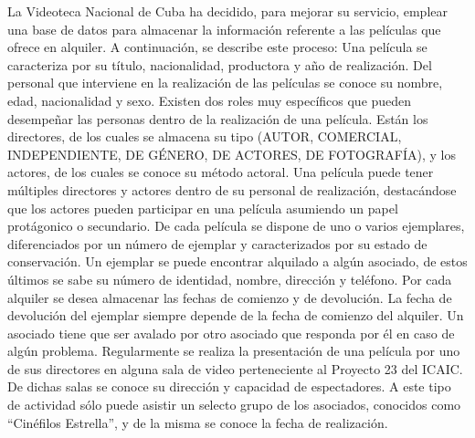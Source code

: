 La Videoteca Nacional de Cuba ha decidido, para mejorar su servicio, emplear una base de datos para almacenar la informaci\'on referente a las pel\'iculas que ofrece en alquiler. A continuaci\'on, se describe este proceso: Una pel\'icula se caracteriza por su t\'itulo, nacionalidad, productora y a\~no de realizaci\'on. Del personal que interviene en la realizaci\'on de las pel\'iculas se conoce su nombre, edad, nacionalidad y sexo. Existen dos roles muy espec\'ificos que pueden desempe\~nar las personas dentro de la realizaci\'on de una pel\'icula. Est\'an los directores, de los cuales se almacena su tipo (AUTOR, COMERCIAL, INDEPENDIENTE, DE G\'ENERO, DE ACTORES, DE FOTOGRAF\'IA), y los actores, de los cuales se conoce su m\'etodo actoral. Una pel\'icula puede tener m\'ultiples directores y actores dentro de su personal de realizaci\'on, destac\'andose que los actores pueden participar en una pel\'icula asumiendo un papel prot\'agonico o secundario. De cada pel\'icula se dispone de uno o varios ejemplares, diferenciados por un n\'umero de ejemplar y caracterizados por su estado de conservaci\'on.  Un ejemplar se puede encontrar alquilado a alg\'un asociado, de estos \'ultimos se sabe su n\'umero de identidad, nombre, direcci\'on y tel\'efono. Por cada alquiler se desea almacenar las fechas de comienzo y de devoluci\'on. La fecha de devoluci\'on del ejemplar siempre depende de la fecha de comienzo del alquiler. Un asociado tiene que ser avalado por otro asociado que responda por \'el en caso de alg\'un problema. Regularmente se realiza la presentaci\'on de una pel\'icula por uno de sus directores en alguna sala de video perteneciente al Proyecto 23 del ICAIC. De dichas salas se conoce su direcci\'on y capacidad de espectadores. A este tipo de actividad s\'olo puede asistir un selecto grupo de los asociados, conocidos como ``Cin\'efilos Estrella'', y de la misma se conoce la fecha de realizaci\'on.